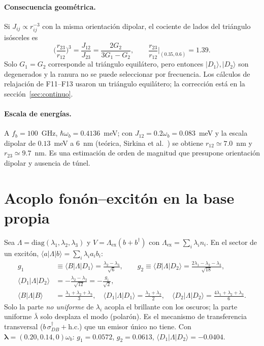 \documentclass[11pt,a4paper]{article}
\newcommand{\ket}[1]{|#1\rangle}
\newcommand{\wb}{\omega_b}
\begin{document}
\paragraph{Consecuencia geométrica.}
Si $J_{ij}\propto r_{ij}^{-3}$ con la misma orientación dipolar, el cociente de lados del triángulo isósceles es
\begin{equation}
\Big(\frac{r_{23}}{r_{12}}\Big)^{3}=\frac{J_{12}}{J_{23}}=\frac{2G_2}{3G_1-G_2},
\qquad \frac{r_{23}}{r_{12}}\Big|_{(0.35,0.6)}=1.39 .
\end{equation}
Solo $G_1=G_2$ corresponde al triángulo equilátero, pero entonces $\ket{D_1},\ket{D_2}$ son degenerados y la ranura no se
puede seleccionar por frecuencia. Los cálculos de relajación de F11--F13 usaron un triángulo equilátero; la corrección está
en la sección~\ref{sec:continuo}.

\paragraph{Escala de energías.}
A $f_b=100$~GHz, $\hbar\wb=0.4136$~meV; con $J_{12}=0.2\wb=0.083$~meV y la escala dipolar de $0.13$~meV a $6$~nm
(teórica, Sirkina et al.~\cite{sirkina2025}) se obtiene $r_{12}\simeq7.0$~nm y $r_{23}\simeq9.7$~nm.
Es una estimación de orden de magnitud que presupone orientación dipolar y ausencia de túnel.

\section{Acoplo fonón--excitón en la base propia}\label{sec:fonon}
Sea $\Lambda=\mathrm{diag}(\lambda_1,\lambda_2,\lambda_3)$ y $V=\Lambda_{\mathrm{ex}}(b+b^\dagger)$ con
$\Lambda_{\mathrm{ex}}=\sum_i\lambda_i n_i$. En el sector de un excitón, $\langle a|\Lambda|b\rangle=\sum_i\lambda_i a_ib_i$:
\begin{align}
g_1&\equiv\langle B|\Lambda|D_1\rangle=\frac{\lambda_2-\lambda_3}{\sqrt6},\qquad
g_2\equiv\langle B|\Lambda|D_2\rangle=\frac{2\lambda_1-\lambda_2-\lambda_3}{\sqrt{18}},\label{eq:g}\\
\langle D_1|\Lambda|D_2\rangle&=-\frac{\lambda_2-\lambda_3}{\sqrt{12}}=-\frac{g_1}{\sqrt2},\nonumber\\
\langle B|\Lambda|B\rangle&=\frac{\lambda_1+\lambda_2+\lambda_3}{3},\quad
\langle D_1|\Lambda|D_1\rangle=\frac{\lambda_2+\lambda_3}2,\quad
\langle D_2|\Lambda|D_2\rangle=\frac{4\lambda_1+\lambda_2+\lambda_3}{6}.\nonumber
\end{align}
Solo la parte \emph{no uniforme} de $\lambda_i$ acopla el brillante con los oscuros; la parte uniforme $\bar\lambda$
solo desplaza el modo (polarón). Es el mecanismo de transferencia transversal ($b\,\sigma_{DB}^\dagger+\mathrm{h.c.}$) que
un emisor único no tiene.
Con $\bm\lambda=(0.20,0.14,0)\wb$: $g_1=0.0572$, $g_2=0.0613$, $\langle D_1|\Lambda|D_2\rangle=-0.0404$.
\end{document}
